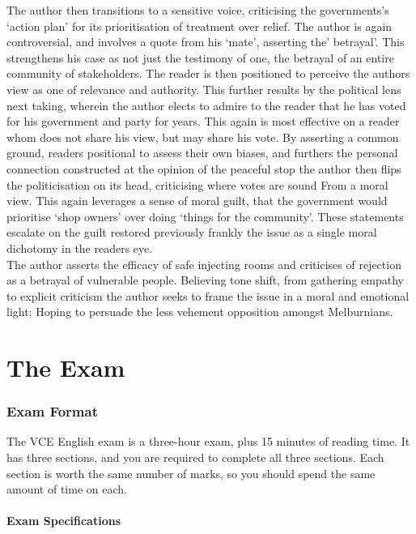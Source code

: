 \documentclass[a4paper]{article}
\makeatletter
\providecommand{\partmark}[1]{\markboth{\partname~\thepart\ #1}{\partname~\thepart\ #1}}
\let\old@part\part
\renewcommand{\part}[1]{%
  \old@part{#1}%
  \partmark{#1}%
}
\makeatother
\begin{document}
The author then transitions to a sensitive voice, criticising the governments’s ‘action plan’ for its prioritisation of treatment over relief. The author is again controversial, and involves a quote from his ‘mate’, asserting the’ betrayal’. This strengthens his case as not just the testimony of one, the betrayal of an entire community of stakeholders. The reader is then positioned to perceive the authors view as one of relevance and authority. This further results by the political lens next taking, wherein the author elects to admire to the reader that he has voted for his government and party for years. This again is most effective on a reader whom does not share his view, but may share his vote. By asserting a common ground, readers positional to assess their own biases, and furthers the personal connection constructed at the opinion of the peaceful stop the author then flips the politicisation on its head, criticising where votes are sound From a moral view. This again leverages a sense of moral guilt, that the government would prioritise ‘shop owners’ over doing ‘things for the community’. These statements escalate on the guilt restored previously frankly the issue as a single moral dichotomy in the readers eye.\\

The author asserts the efficacy of safe injecting rooms and criticises of rejection as a betrayal of vulnerable people. Believing tone shift, from gathering empathy to explicit criticism the author seeks to frame the issue in a moral and emotional light; Hoping to persuade the less vehement opposition amongst Melburnians.\\

\cleardoublepage

\clearpage
\thispagestyle{empty}
\hfill
\clearpage
\cleardoublepage
\part{The Exam}
\clearpage
\thispagestyle{empty}
\hfill
\clearpage


\section{Exam Format}
The VCE English exam is a three-hour exam, plus 15 minutes of reading time. It has three sections, and you are required to complete all three sections. Each section is worth the same number of marks, so you should spend the same amount of time on each. 

\subsection{Exam Specifications}
\end{document}
